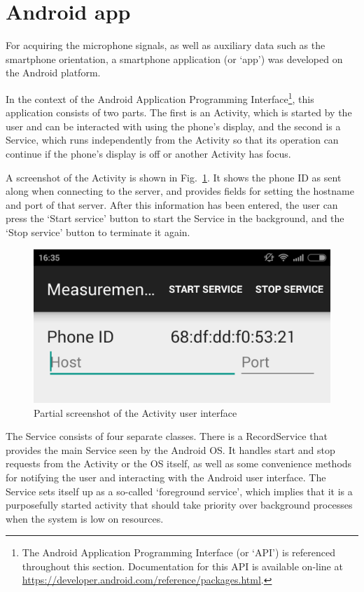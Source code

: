 \documentclass[a4paper, notitlepage]{report}
\begin{document}
\section{Android app}
\label{sec:android}
For acquiring the microphone signals, as well as auxiliary data such as the smartphone orientation, a smartphone application (or `app') was developed on the Android platform.

In the context of the Android Application Programming Interface\footnote{The Android Application Programming Interface (or `API') is referenced throughout this section. Documentation for this API is available on-line at \url{https://developer.android.com/reference/packages.html}.}, this application consists of two parts. The first is an Activity, which is started by the user and can be interacted with using the phone's display, and the second is a Service, which runs independently from the Activity so that its operation can continue if the phone's display is off or another Activity has focus. 

A screenshot of the Activity is shown in Fig.~\ref{fig:app-activity}. It shows the phone ID as sent along when connecting to the \matlab server, and provides fields for setting the hostname and port of that server. After this information has been entered, the user can press the `Start service' button to start the Service in the background, and the `Stop service' button to terminate it again.

\begin{figure}[hbt]
	\centering 
		\includegraphics[width=0.25\paperwidth]{figures/measurementapp_activity_crop.png}
		\caption[Android Activity user interface.]{Partial screenshot of the Activity user interface}
		\label{fig:app-activity}
\end{figure}

The Service consists of four separate classes. There is a RecordService that provides the main Service seen by the Android OS. It handles start and stop requests from the Activity or the OS itself, as well as some convenience methods for notifying the user and interacting with the Android user interface. The Service sets itself up as a so-called `foreground service', which implies that it is a purposefully started activity that should take priority over background processes when the system is low on resources.
\end{document}
